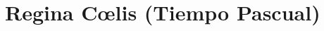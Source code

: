 \documentclass[10pt,twoside]{book}
\begin{document}
\section*{Regina C{\oe}lis (Tiempo Pascual)}
\vspace{0.2em}
\begin{paracol}{2}
      \begin{leftcolumn}
            
      \end{leftcolumn}
      \begin{otherlanguage}{latin}
            \begin{rightcolumn}
                  
            \end{rightcolumn}
      \end{otherlanguage}


      \begin{leftcolumn*}
            
      \end{leftcolumn*}
      \begin{otherlanguage}{latin}
            \begin{rightcolumn}
                  
            \end{rightcolumn}
      \end{otherlanguage}
\end{paracol}


\nocite{*}
\printbibliography
\end{document}
